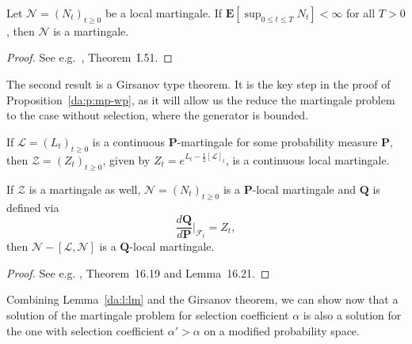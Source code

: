 \begin{Lemma} \label{da:l:lm}
Let $\mathcal N = (N_t)_{t\geq 0}$ be a local martingale. If
$\mathbf E[\sup_{0\leq t\leq T}N_t]<\infty$ for all $T>0$, then
$\mathcal N$ is a martingale.
\end{Lemma}
\begin{proof} 
See e.g.\ \citet{protter_stochastic_2005}, Theorem~I.51.
\end{proof}

\noindent
The second result is a Girsanov type theorem. It is the key step in the proof of
Proposition~\ref{da:p:mp-wp}, as it will allow us the reduce the martingale problem to the case
without selection, where the generator is bounded.

\begin{Theorem} \label{da:t:grisanov}
If $\mathcal L=(L_t)_{t\geq 0}$ is a continuous $\mathbf P$-martingale for some probability measure
$\mathbf P$, then $\mathcal Z = (Z_t)_{t\geq 0}$, given by 
$Z_t = e^{L_t - \tfrac 12 [\mathcal{L}]_t}$, is a continuous local martingale. 

\noindent
If $\mathcal Z$ is a martingale as well, $\mathcal N = (N_t)_{t\geq 0}$ is a $\mathbf P$-local
martingale and $\mathbf Q$ is defined via
$$ \frac{d\mathbf Q}{d\mathbf P}\Big|_{\mathcal F_t} = Z_t,$$
then $\mathcal N - [\mathcal L, \mathcal N]$ is a $\mathbf Q$-local martingale. 
\end{Theorem}
\begin{proof} 
See e.g. \citet{kallenberg_foundations_1997}, Theorem~16.19 and Lemma~16.21.
\end{proof}

\noindent
Combining Lemma~\ref{da:l:lm} and the Girsanov theorem, we can show now that a
solution of the martingale problem for selection coefficient $\alpha$ is also a
solution for the one with selection coefficient $\alpha' > \alpha$ on a modified
probability space.

